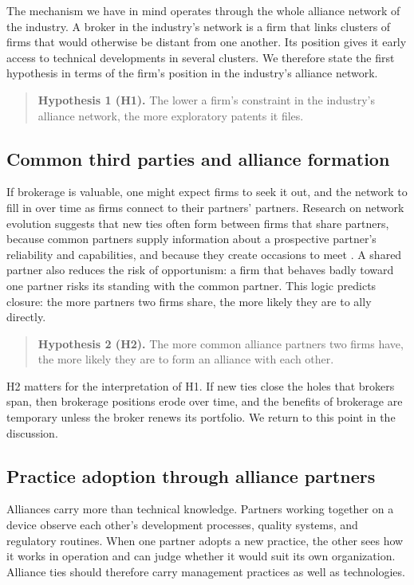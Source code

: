 \documentclass[12pt]{article}
\begin{document}
The mechanism we have in mind operates through the whole alliance network of the industry. A broker in the industry's network is a firm that links clusters of firms that would otherwise be distant from one another. Its position gives it early access to technical developments in several clusters. We therefore state the first hypothesis in terms of the firm's position in the industry's alliance network.

\begin{quote}
\textbf{Hypothesis 1 (H1).} The lower a firm's constraint in the industry's alliance network, the more exploratory patents it files.
\end{quote}

\subsection{Common third parties and alliance formation}

If brokerage is valuable, one might expect firms to seek it out, and the network to fill in over time as firms connect to their partners' partners. Research on network evolution suggests that new ties often form between firms that share partners, because common partners supply information about a prospective partner's reliability and capabilities, and because they create occasions to meet \citep{rosenkopfpadula2008,gulati2012}. A shared partner also reduces the risk of opportunism: a firm that behaves badly toward one partner risks its standing with the common partner. This logic predicts closure: the more partners two firms share, the more likely they are to ally directly.

\begin{quote}
\textbf{Hypothesis 2 (H2).} The more common alliance partners two firms have, the more likely they are to form an alliance with each other.
\end{quote}

H2 matters for the interpretation of H1. If new ties close the holes that brokers span, then brokerage positions erode over time, and the benefits of brokerage are temporary unless the broker renews its portfolio. We return to this point in the discussion.

\subsection{Practice adoption through alliance partners}

Alliances carry more than technical knowledge. Partners working together on a device observe each other's development processes, quality systems, and regulatory routines. When one partner adopts a new practice, the other sees how it works in operation and can judge whether it would suit its own organization. Alliance ties should therefore carry management practices as well as technologies.
\end{document}
